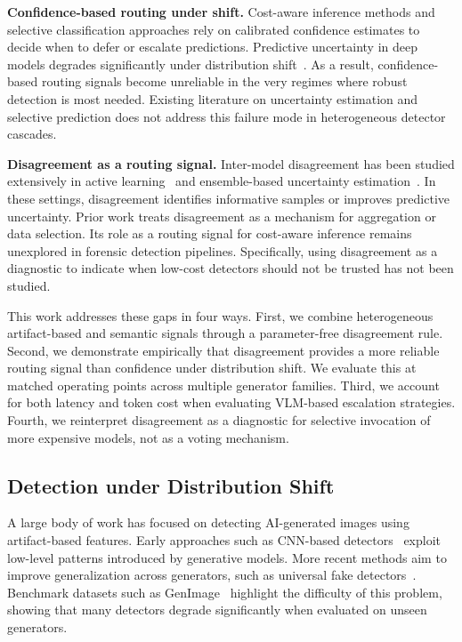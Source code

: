 \documentclass{ieeeaccess}
\begin{document}
\textbf{Confidence-based routing under shift.} Cost-aware inference methods and selective classification approaches rely on calibrated confidence estimates to decide when to defer or escalate predictions. Predictive uncertainty in deep models degrades significantly under distribution shift~\cite{ovadia2019can}. As a result, confidence-based routing signals become unreliable in the very regimes where robust detection is most needed. Existing literature on uncertainty estimation and selective prediction does not address this failure mode in heterogeneous detector cascades.

\textbf{Disagreement as a routing signal.} Inter-model disagreement has been studied extensively in active learning~\cite{seung1992query} and ensemble-based uncertainty estimation~\cite{lakshminarayanan2017simple}. In these settings, disagreement identifies informative samples or improves predictive uncertainty. Prior work treats disagreement as a mechanism for aggregation or data selection. Its role as a routing signal for cost-aware inference remains unexplored in forensic detection pipelines. Specifically, using disagreement as a diagnostic to indicate when low-cost detectors should not be trusted has not been studied.

This work addresses these gaps in four ways. First, we combine heterogeneous artifact-based and semantic signals through a parameter-free disagreement rule. Second, we demonstrate empirically that disagreement provides a more reliable routing signal than confidence under distribution shift. We evaluate this at matched operating points across multiple generator families. Third, we account for both latency and token cost when evaluating VLM-based escalation strategies. Fourth, we reinterpret disagreement as a diagnostic for selective invocation of more expensive models, not as a voting mechanism.

\subsection{Detection under Distribution Shift}

A large body of work has focused on detecting AI-generated images using artifact-based features. Early approaches such as CNN-based detectors~\cite{wang2020cnn} exploit low-level patterns introduced by generative models. More recent methods aim to improve generalization across generators, such as universal fake detectors~\cite{ojha2023fakedetect}. Benchmark datasets such as GenImage~\cite{NEURIPS2023_f4d4a021} highlight the difficulty of this problem, showing that many detectors degrade significantly when evaluated on unseen generators.
\end{document}
